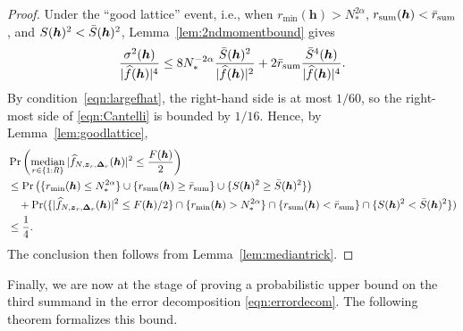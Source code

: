 \documentclass[a4paper,11pt]{article}
\newcommand{\bsh}{\boldsymbol{h}}
\newcommand{\bsz}{\boldsymbol{z}}
\newcommand{\bsDelta}{\boldsymbol{\Delta}}
\begin{document}
\begin{proof}
    Under the ``good lattice'' event, i.e., when $r_{\min}(\bsh)> N^{2\alpha}_*$, $r_{\mathrm{sum}}(\bsh)< \Bar{r}_{\mathrm{sum}}$, and $S(\bsh)^2< \Bar{S}(\bsh)^2$, Lemma~\ref{lem:2ndmomentbound} gives
    \[ 
    \frac{\sigma^2(\bsh)}{|\widehat{f}(\bsh)|^4}\leq 8N^{-2\alpha}_*\frac{\Bar{S}(\bsh)^2}{|\widehat{f}(\bsh)|^2}  +2\Bar{r}_{\mathrm{sum}}  \frac{\Bar{S}^4(\bsh)}{|\widehat{f}(\bsh)|^4}.
    \]
    By condition~\eqref{eqn:largefhat}, the right-hand side is at most $1/60$, so the right-most side of \eqref{eqn:Cantelli} is bounded by $1/16$. Hence, by Lemma~\ref{lem:goodlattice},
    \begin{align*}
     & \Pr\left(\operatorname*{median}_{r\in\{1{:}R\}}| \widehat{f}_{N,\bsz_r,\bsDelta_r}(\bsh)|^2\leq \frac{F(\bsh)}{2}\right) \\
     & \le \Pr\left(\{r_{\min}(\bsh) \leq N^{2\alpha}_*\}\cup \{r_{\mathrm{sum}}(\bsh)\ge \Bar{r}_{\mathrm{sum}}\}\cup \{S(\bsh)^2\ge\Bar{S}(\bsh)^2\}\right) \\
     & \quad + \Pr(\{|\widehat{f}_{N,\bsz_r,\bsDelta_r}(\bsh)|^2\leq F(\bsh)/2\}\cap \{r_{\min}(\bsh)> N^{2\alpha}_*\}\cap \{r_{\mathrm{sum}}(\bsh)< \Bar{r}_{\mathrm{sum}}\}\cap \{S(\bsh)^2<\Bar{S}(\bsh)^2\})\\
     & \le \frac{1}{4}.
    \end{align*}
    The conclusion then follows from Lemma~\ref{lem:mediantrick}.
\end{proof}

Finally, we are now at the stage of proving a probabilistic upper bound on the third summand in the error decomposition \eqref{eqn:errordecom}.
The following theorem formalizes this bound.
\end{document}
